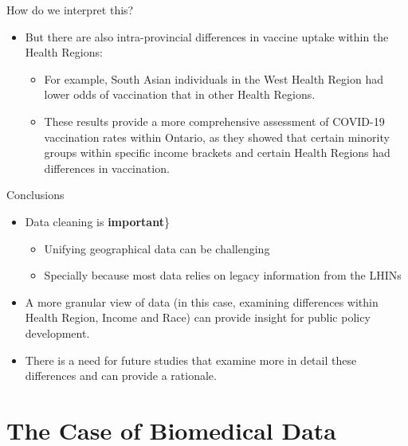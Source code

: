 \documentclass[
  ignorenonframetext,
]{beamer}
\providecommand{\tightlist}{%
  \setlength{\itemsep}{0pt}\setlength{\parskip}{0pt}}\usepackage{longtable,booktabs,array}
\begin{document}
\begin{frame}{How do we interpret this?}
\protect\hypertarget{how-do-we-interpret-this-1}{}
\begin{itemize}[<+->]
\item
  But there are also intra-provincial differences in vaccine uptake
  within the Health Regions:

  \begin{itemize}[<+->]
  \item
    For example, South Asian individuals in the West Health Region had
    lower odds of vaccination that in other Health Regions.
  \item
    These results provide a more comprehensive assessment of COVID-19
    vaccination rates within Ontario, as they showed that certain
    minority groups within specific income brackets and certain Health
    Regions had differences in vaccination.
  \end{itemize}
\end{itemize}
\end{frame}

\begin{frame}{Conclusions}
\protect\hypertarget{conclusions}{}
\begin{itemize}[<+->]
\item
  Data cleaning is \textbf{important}\}

  \begin{itemize}[<+->]
  \tightlist
  \item
    Unifying geographical data can be challenging
  \item
    Specially because most data relies on legacy information from the
    LHINs
  \end{itemize}
\item
  A more granular view of data (in this case, examining differences
  within Health Region, Income and Race) can provide insight for public
  policy development.
\item
  There is a need for future studies that examine more in detail these
  differences and can provide a rationale.
\end{itemize}
\end{frame}

\hypertarget{the-case-of-biomedical-data}{%
\section{The Case of Biomedical
Data}\label{the-case-of-biomedical-data}}
\end{document}
